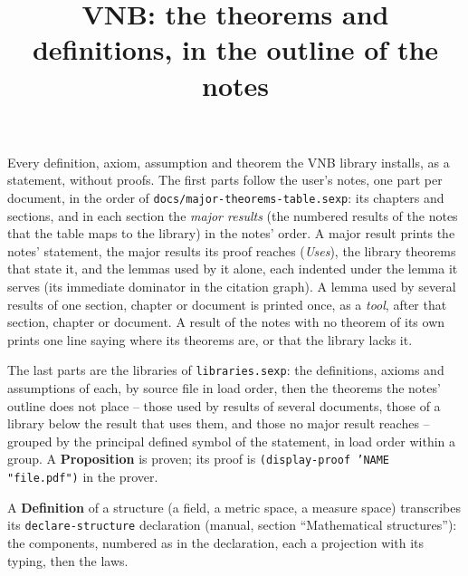 \documentclass[11pt]{report}
\title{VNB: the theorems and definitions, in the outline of the notes}
\author{}
\date{}
\begin{document}
\maketitle

\noindent
Every definition, axiom, assumption and theorem the VNB library installs, as a
statement, without proofs.  The first parts follow the user's notes, one part per
document, in the order of \texttt{docs/major-theorems-table.sexp}: its chapters and
sections, and in each section the \emph{major results} (the numbered results of the
notes that the table maps to the library) in the notes' order.  A major result prints
the notes' statement, the major results its proof reaches (\emph{Uses}), the library
theorems that state it, and the lemmas used by it alone, each indented under the lemma
it serves (its immediate dominator in the citation graph).  A lemma used by several
results of one section, chapter or document is printed once, as a \emph{tool}, after
that section, chapter or document.  A result of the notes with no theorem of its own
prints one line saying where its theorems are, or that the library lacks it.

\noindent
The last parts are the libraries of \texttt{libraries.sexp}: the definitions, axioms
and assumptions of each, by source file in load order, then the theorems the notes'
outline does not place -- those used by results of several documents, those of a
library below the result that uses them, and those no major result reaches -- grouped
by the principal defined symbol of the statement, in load order within a group.
A \textbf{Proposition} is proven; its proof is \texttt{(display-proof 'NAME "file.pdf")}
in the prover.

\noindent
A \textbf{Definition} of a structure (a field, a metric space, a measure space)
transcribes its \texttt{declare-structure} declaration (manual, section
``Mathematical structures''): the components, numbered as in the declaration, each a
projection with its typing, then the laws.


\end{document}
